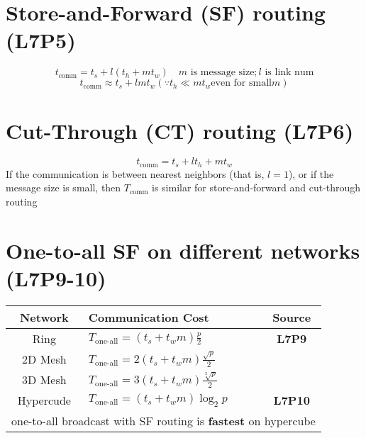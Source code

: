 \section*{Store-and-Forward (SF) routing (\textbf{L7P5})}
\begin{equation*}
  t_{\text{comm}} = t_{s} + l(t_h + mt_w) \quad m \text{ is message size}; l \text{ is link num}
\end{equation*}
\begin{equation*}
  t_{\text{comm}} \approx t_{s} + lmt_w (\because t_h \ll mt_w \text{even for small} m)
\end{equation*}
\section*{Cut-Through (CT) routing (\textbf{L7P6})}
\begin{equation*}
  t_{\text{comm}} = t_{s} + lt_h + mt_w
\end{equation*}
If the communication is between nearest neighbors (that is, $l = 1$), or if the message size is small, then $T_{\text{comm}}$ is similar for store-and-forward and cut-through routing
\section*{One-to-all SF on different networks (\textbf{L7P9-10})}
\begin{tabular}{c|lc}
  \hline
  Network & Communication Cost & Source \\
  \hline
  Ring & $T_{\text{one-all}} = (t_s + t_{w}m) \frac{p}{2}$  & \textbf{L7P9} \\
  2D Mesh & $T_{\text{one-all}} = 2(t_s + t_{w}m) \frac{\sqrt{p}}{2}$ & \\
  3D Mesh & $T_{\text{one-all}} = 3(t_s + t_{w}m) \frac{\sqrt[3]{p}}{2}$ &  \\
  Hypercude & $T_{\text{one-all}} = (t_s + t_{w}m) \log_2 p$ & \textbf{L7P10} \\
  \hline
  \multicolumn{3}{l}{one-to-all broadcast with SF routing is \textbf{fastest} on hypercube}\\
  \hline
\end{tabular}
